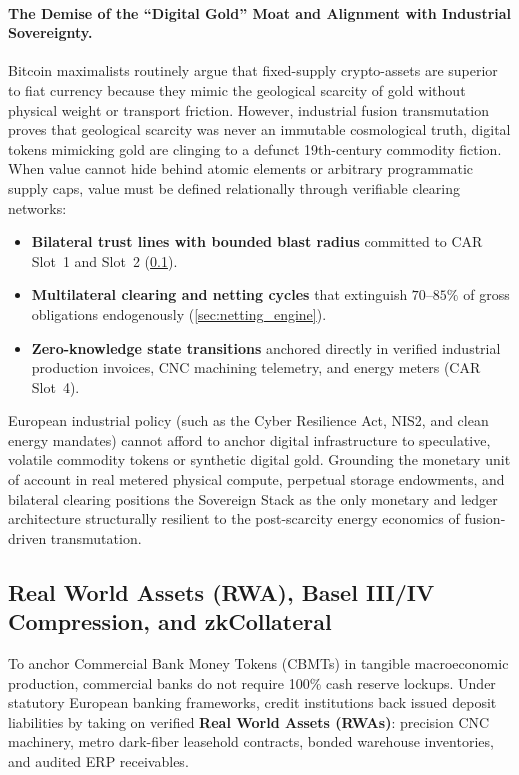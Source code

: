 \documentclass[a4paper,11pt,twoside,parskip=half-,headings=small]{scrartcl}
\begin{document}
\paragraph{The Demise of the ``Digital Gold'' Moat and Alignment with Industrial Sovereignty.}
Bitcoin maximalists routinely argue that fixed-supply crypto-assets are superior to fiat currency because they mimic the geological scarcity of gold without physical weight or transport friction. However, industrial fusion transmutation proves that geological scarcity was never an immutable cosmological truth, digital tokens mimicking gold are clinging to a defunct 19th-century commodity fiction. When value cannot hide behind atomic elements or arbitrary programmatic supply caps, value must be defined relationally through verifiable clearing networks:
\begin{itemize}[nosep]
  \item \textbf{Bilateral trust lines with bounded blast radius} committed to CAR Slot~1 and Slot~2 (\cref{sec:rwa_zkcollateral}).
  \item \textbf{Multilateral clearing and netting cycles} that extinguish $70$--$85\%$ of gross obligations endogenously (\cref{sec:netting_engine}).
  \item \textbf{Zero-knowledge state transitions} anchored directly in verified industrial production invoices, CNC machining telemetry, and energy meters (CAR Slot~4).
\end{itemize}
European industrial policy (such as the Cyber Resilience Act, NIS2, and clean energy mandates) cannot afford to anchor digital infrastructure to speculative, volatile commodity tokens or synthetic digital gold. Grounding the monetary unit of account in real metered physical compute, perpetual storage endowments, and bilateral clearing positions the Sovereign Stack as the only monetary and ledger architecture structurally resilient to the post-scarcity energy economics of fusion-driven transmutation.

\subsection{Real World Assets (RWA), Basel III/IV Compression, and zkCollateral}
\label{sec:rwa_zkcollateral}

To anchor Commercial Bank Money Tokens (CBMTs) in tangible macroeconomic production, commercial
banks do not require 100\% cash reserve lockups. Under statutory European banking frameworks,
credit institutions back issued deposit liabilities by taking on verified \textbf{Real World Assets (RWAs)}:
precision CNC machinery, metro dark-fiber leasehold contracts, bonded warehouse inventories, and audited
ERP receivables.
\end{document}
